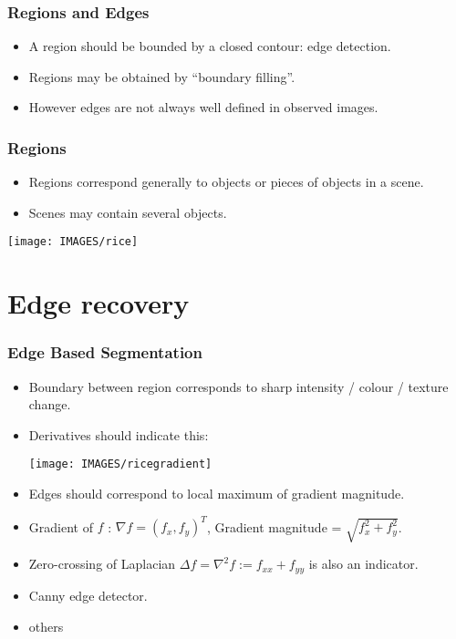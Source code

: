\documentclass[9pt]{beamer}
\begin{document}
\begin{frame}
  \frametitle{Regions and Edges}
  \begin{itemize}
  \item A region should be bounded by a closed contour: edge
    detection.
  \item Regions may be obtained by ``boundary filling''.\vfill
  \item However edges are not always well defined in observed images. 
  \end{itemize}
  \pause
  \begin{center}
  \end{center}
\end{frame}




\begin{frame}
  \frametitle{Regions}
  \begin{itemize}
  \item Regions correspond generally to objects or pieces of objects in a scene. 
  \item Scenes may contain several objects.
  \end{itemize}
  \begin{center}
    \texttt{[image: IMAGES/rice]}
 \end{center}
\end{frame}



\section{Edge recovery}


\begin{frame}
  \frametitle{Edge Based Segmentation}
  \begin{itemize}
  \item Boundary between region corresponds to sharp intensity / colour / texture change.
  \item Derivatives should indicate this:
    \begin{center}
      \texttt{[image: IMAGES/ricegradient]}
    \end{center}
  \item Edges should correspond to local maximum of gradient magnitude.
  \item Gradient of $f$ : $\nabla f = (f_x,f_y)^T$, Gradient magnitude = $\sqrt{f_x^2 + f_y^2}$.
  \item Zero-crossing of Laplacian $\Delta f = \nabla^2 f := f_{xx} + f_{yy}$ is also an indicator.
  \item Canny edge detector.
\item others
  \end{itemize} 
  
\end{frame}
\end{document}

